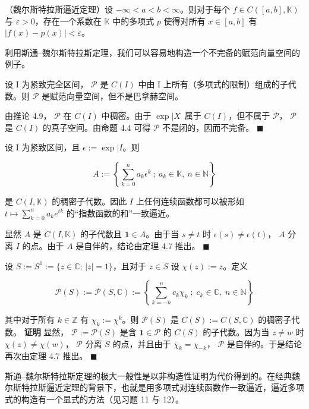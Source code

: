 \begin{corollary}

（魏尔斯特拉斯逼近定理）设  $-\infty < a < b < \infty$。则对于每个  $f \in C([a, b], \mathbb{K})$ 与  $\varepsilon > 0$，存在一个系数在  $\mathbb{K}$ 中的多项式  $p$ 使得对所有  $x \in [a, b]$ 有  $|f(x) - p(x)| < \varepsilon$。

利用斯通–魏尔斯特拉斯定理，我们可以容易地构造一个不完备的赋范向量空间的例子。

\end{corollary}

\begin{example}

\begin{items}
\item

设 I 为紧致完全区间， $\mathcal{P}$ 是  $C(I)$ 中由 I 上所有（多项式的限制）组成的子代数。则  $\mathcal{P}$ 是赋范向量空间，但不是巴拿赫空间。

\proofhead
由推论 4.9， $\mathcal{P}$ 在  $C(I)$ 中稠密。由于  $ \exp |X $\ 属于  $ C(I) $，但不属于  $ \mathcal{P} $， $\mathcal{P}$ 是  $C(I)$ 的真子空间。由命题 4.4 可得  $\mathcal{P}$ 不是闭的，因而不完备。 $ \blacksquare $
\item

设 I 为紧致区间，且  $ \epsilon := \exp |I $。则

\[
{A}:=\left\{\left.\sum_{k=0}^{n}a_{k}\epsilon^{k}\right.~;~a_{k}\in\mathbb{K},~n\in\mathbb{N}\right\}
\]

是 $C(I, \mathbb{K})$ 的稠密子代数。因此 $I$ 上任何连续函数都可以被形如 $t \mapsto \sum_{k=0}^{n} a_k e^{tk}$ 的“指数函数的和”一致逼近。

\proofhead
显然  $A$ 是  $C(I, \mathbb{K})$ 的子代数且  $\mathbf{1} \in A$。由于当  $s \neq t$ 时  $\epsilon(s) \neq \epsilon(t)$， $A$ 分离  $I$ 的点。由于  $A$ 是自伴的，结论由定理 4.7 推出。 $ \blacksquare $
\item

设  $S := S^1 := \{ z \in \mathbb{C} ; \, |z| = 1 \}$，且对于  $z \in S$ 设  $\chi(z) := z$。定义

\[
\mathcal{P}(S):=\mathcal{P}(S,\mathbb{C}):=\left\{\textstyle\sum_{k=-n}^{n}c_{k}\chi_{k}\;;\;c_{k}\in\mathbb{C},\;n\in\mathbb{N}\right\}
\]

其中对于所有  $k \in \mathbb{Z}$ 有  $\chi_k := \chi^k$。则  $\mathcal{P}(S)$ 是  $C(S) := C(S, \mathbb{C})$ 的稠密子代数。
\textbf{证明} 显然， $\mathcal{P} := \mathcal{P}(S)$ 是含  $\mathbf{1} \in \mathcal{P}$ 的  $C(S)$ 的子代数。因为当  $z \neq w$ 时  $\chi(z) \neq \chi(w)$， $\mathcal{P}$ 分离  $S$ 的点，并且由于  $\overline{\chi}_k = \chi_{-k}$， $\mathcal{P}$ 是自伴的。于是结论再次由定理 4.7 推出。 $ \blacksquare $

\end{items}

斯通–魏尔斯特拉斯定理的极大一般性是以非构造性证明为代价得到的。在经典魏尔斯特拉斯逼近定理的背景下，也就是用多项式对连续函数作一致逼近，逼近多项式的构造有一个显式的方法（见习题 11 与 12）。

\end{example}


